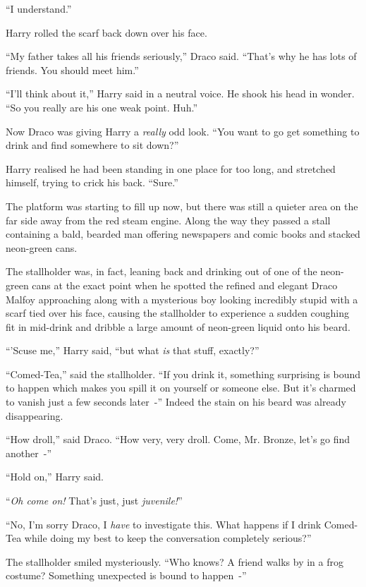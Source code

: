 ``I understand.''

Harry rolled the scarf back down over his face.

``My father takes all his friends seriously,'' Draco said. ``That's why he has lots of friends. You should meet him.''

``I'll think about it,'' Harry said in a neutral voice. He shook his head in wonder. ``So you really are his one weak point. Huh.''

Now Draco was giving Harry a \emph{really} odd look. ``You want to go get something to drink and find somewhere to sit down?''

Harry realised he had been standing in one place for too long, and stretched himself, trying to crick his back. ``Sure.''

The platform was starting to fill up now, but there was still a quieter area on the far side away from the red steam engine. Along the way they passed a stall containing a bald, bearded man offering newspapers and comic books and stacked neon-green cans.

The stallholder was, in fact, leaning back and drinking out of one of the neon-green cans at the exact point when he spotted the refined and elegant Draco Malfoy approaching along with a mysterious boy looking incredibly stupid with a scarf tied over his face, causing the stallholder to experience a sudden coughing fit in mid-drink and dribble a large amount of neon-green liquid onto his beard.

``'Scuse me,'' Harry said, ``but what \emph{is} that stuff, exactly?''

``Comed-Tea,'' said the stallholder. ``If you drink it, something surprising is bound to happen which makes you spill it on yourself or someone else. But it's charmed to vanish just a few seconds later~-'' Indeed the stain on his beard was already disappearing.

``How droll,'' said Draco. ``How very, very droll. Come, Mr. Bronze, let's go find another~-''

``Hold on,'' Harry said.

``\emph{Oh come on!} That's just, just \emph{juvenile!}''

``No, I'm sorry Draco, I \emph{have} to investigate this. What happens if I drink Comed-Tea while doing my best to keep the conversation completely serious?''

The stallholder smiled mysteriously. ``Who knows? A friend walks by in a frog costume? Something unexpected is bound to happen~-''


